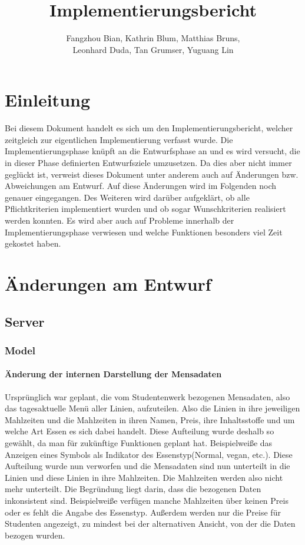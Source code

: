 \documentclass[a4paper]{scrreprt}
\begin{document}
\title{Implementierungsbericht}
\author{Fangzhou Bian, Kathrin Blum, Matthias Bruns, \\Leonhard Duda, Tan Grumser, Yuguang Lin}
\maketitle
\tableofcontents



\chapter{Einleitung}

Bei diesem Dokument handelt es sich um den Implementierungsbericht, welcher zeitgleich zur eigentlichen Implementierung verfasst wurde. Die Implementierungsphase knüpft an die Entwurfsphase an und es wird versucht, die in dieser Phase definierten Entwurfsziele umzusetzen. Da dies aber nicht immer geglückt ist, verweist dieses Dokument unter anderem auch auf Änderungen bzw. Abweichungen am Entwurf. Auf diese Änderungen wird im Folgenden noch genauer eingegangen. Des Weiteren wird darüber aufgeklärt, ob alle Pflichtkriterien implementiert wurden und ob sogar Wunschkriterien realisiert werden konnten. Es wird aber auch auf Probleme innerhalb der Implementierungsphase verwiesen und welche Funktionen besonders viel Zeit gekostet haben.

\chapter{Änderungen am Entwurf}
\section{Server}
\subsection{Model}

\subsubsection{Änderung der internen Darstellung der Mensadaten}
Ursprünglich war geplant, die vom Studentenwerk bezogenen Mensadaten, also das tagesaktuelle Menü aller Linien, aufzuteilen. Also die Linien in ihre jeweiligen Mahlzeiten und die Mahlzeiten in ihren Namen, Preis, ihre Inhaltsstoffe und um welche Art Essen es sich dabei handelt. Diese Aufteilung wurde deshalb so gewählt, da man für zukünftige Funktionen geplant hat. Beispielweiße das Anzeigen eines Symbols als Indikator des Essenstyp(Normal, vegan, etc.). Diese Aufteilung wurde nun verworfen und die Mensadaten sind nun unterteilt in die Linien und diese Linien in ihre Mahlzeiten. Die Mahlzeiten werden also nicht mehr unterteilt. Die Begründung liegt darin, dass die bezogenen Daten inkonsistent sind. Beispielweiße verfügen manche Mahlzeiten über keinen Preis oder es fehlt die Angabe des Essenstyp. Außerdem werden nur die Preise für Studenten angezeigt, zu mindest bei der alternativen Ansicht, von der die Daten bezogen wurden.
\end{document}
